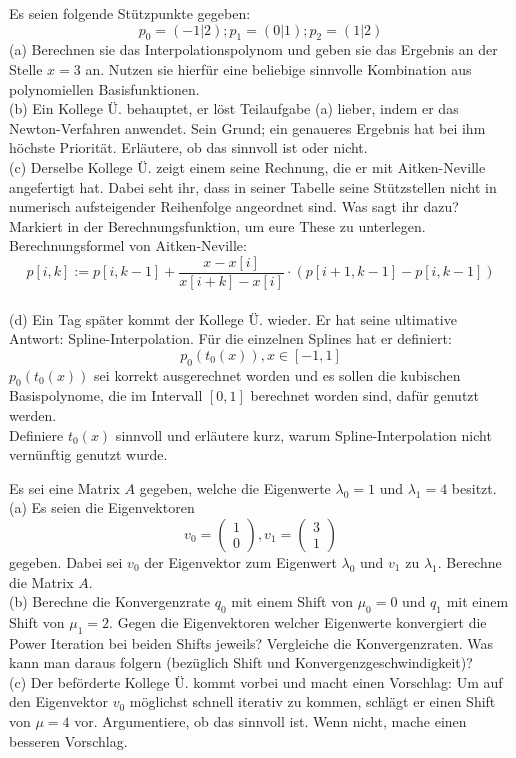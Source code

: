\documentclass{scrartcl}
\begin{document}
	Es seien folgende Stützpunkte gegeben:
	$$p_0 = (-1 | 2); p_1 = (0 | 1); p_2 = (1 | 2)$$
	\n
	(a)
	Berechnen sie das Interpolationspolynom und geben sie das Ergebnis an der Stelle $x = 3$ an. Nutzen sie hierfür eine beliebige sinnvolle Kombination aus polynomiellen Basisfunktionen.
	\lbreak \lbreak \lbreak
	\\
	(b)
	Ein Kollege Ü. behauptet, er löst Teilaufgabe (a) lieber, indem er das Newton-Verfahren anwendet. Sein Grund; ein genaueres Ergebnis hat bei ihm höchste Priorität. Erläutere, ob das sinnvoll ist oder nicht.
	\lbreak \lbreak \lbreak
	\\
	(c)
	Derselbe Kollege Ü. zeigt einem seine Rechnung, die er mit Aitken-Neville angefertigt hat. Dabei seht ihr, dass in seiner Tabelle seine Stützstellen nicht in numerisch aufsteigender Reihenfolge angeordnet sind. Was sagt ihr dazu? Markiert in der Berechnungsfunktion, um eure These zu unterlegen. \\
	Berechnungsformel von Aitken-Neville:
	$$p[i,k] := p[i, k-1] + \frac{x-x[i]}{x[i+k]-x[i]} \cdot (p[i+1, k-1] - p[i, k-1])$$
	\lbreak \lbreak \lbreak
	\\
	(d)
	Ein Tag später kommt der Kollege Ü. wieder. Er hat seine ultimative Antwort: Spline-Interpolation. Für die einzelnen Splines hat er definiert:
	$$p_0(t_0(x)), x \in [-1, 1]$$
	$p_0(t_0(x))$ sei korrekt ausgerechnet worden und es sollen die kubischen Basispolynome, die im Intervall $[0, 1]$ berechnet worden sind, dafür genutzt werden. \sbreak \\
	Definiere $t_0(x)$ sinnvoll und erläutere kurz, warum Spline-Interpolation nicht vernünftig genutzt wurde.

	
	
	Es sei eine Matrix $A$ gegeben, welche die Eigenwerte $\lambda_0 = 1$ und $\lambda_1 = 4$ besitzt.
	\lbreak \\
	(a)
	Es seien die Eigenvektoren $$v_0 = \begin{pmatrix}
		1 \\ 0
	\end{pmatrix}, v_1 = \begin{pmatrix}
		3 \\ 1
	\end{pmatrix}$$ gegeben. Dabei sei $v_0$ der Eigenvektor zum Eigenwert $\lambda_0$ und $v_1$ zu $\lambda_1$. Berechne die Matrix $A$.
	\lbreak \lbreak \lbreak \lbreak
	\\
	(b)
	Berechne die Konvergenzrate $q_0$ mit einem Shift von $\mu_0 = 0$ und $q_1$ mit einem Shift von $\mu_1 = 2$.
	Gegen die Eigenvektoren welcher Eigenwerte konvergiert die Power Iteration bei beiden Shifts jeweils? Vergleiche die Konvergenzraten. Was kann man daraus folgern (bezüglich Shift und Konvergenzgeschwindigkeit)?
	\lbreak \lbreak \lbreak \lbreak
	\\
	(c)
	Der beförderte Kollege Ü. kommt vorbei und macht einen Vorschlag: Um auf den Eigenvektor $v_0$ möglichst schnell iterativ zu kommen, schlägt er einen Shift von $\mu = 4$ vor. Argumentiere, ob das sinnvoll ist. Wenn nicht, mache einen besseren Vorschlag.
\end{document}
